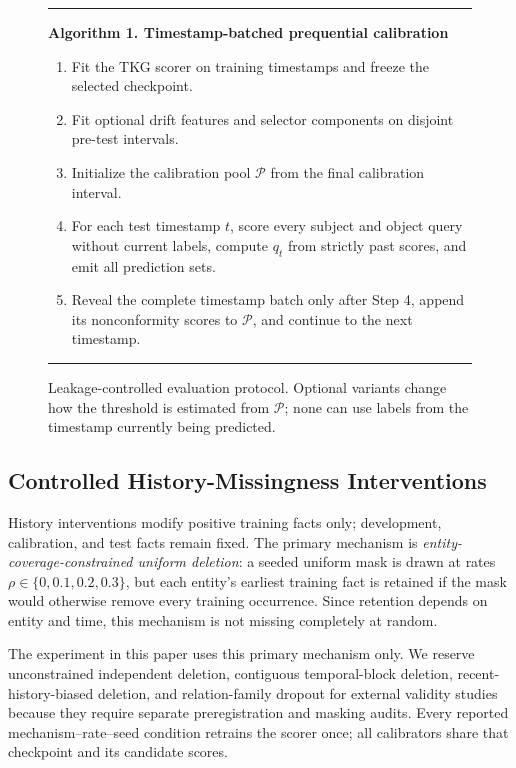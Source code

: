 \documentclass[information,article,submit,oneauthor,pdftex]{Definitions/mdpi}
\begin{document}
\begin{figure}[t]
\centering
\begin{minipage}{0.94\columnwidth}
\hrule\vspace{5pt}
\textbf{Algorithm 1. Timestamp-batched prequential calibration}
\begin{enumerate}[leftmargin=5mm,itemsep=2pt,topsep=4pt]
  \item Fit the TKG scorer on training timestamps and freeze the selected
  checkpoint.
  \item Fit optional drift features and selector components on disjoint
  pre-test intervals.
  \item Initialize the calibration pool \(\mathcal{P}\) from the final
  calibration interval.
  \item For each test timestamp \(t\), score every subject and object query
  without current labels, compute \(q_t\) from strictly past scores, and emit all
  prediction sets.
  \item Reveal the complete timestamp batch only after Step 4, append its
  nonconformity scores to \(\mathcal{P}\), and continue to the next timestamp.
\end{enumerate}
\vspace{2pt}\hrule
\end{minipage}
\caption{Leakage-controlled evaluation protocol. Optional variants change how
the threshold is estimated from \(\mathcal{P}\); none can use labels from the
timestamp currently being predicted.}
\label{alg:riskcal}
\end{figure}

\subsection{Controlled History-Missingness Interventions}

History interventions modify positive training facts only; development,
calibration, and test facts remain fixed. The primary mechanism is
\emph{entity-coverage-constrained uniform deletion}: a seeded uniform mask is
drawn at rates \(\rho\in\{0,0.1,0.2,0.3\}\), but each entity's earliest
training fact is retained if the mask would otherwise remove every training
occurrence. Since retention depends on entity and time, this mechanism is not
missing completely at random.

The experiment in this paper uses this primary mechanism only. We
reserve unconstrained independent deletion, contiguous temporal-block deletion,
recent-history-biased deletion, and relation-family dropout for external
validity studies because they require separate preregistration and masking
audits. Every reported mechanism--rate--seed condition retrains the scorer once;
all calibrators share that checkpoint and its candidate scores.
\end{document}
